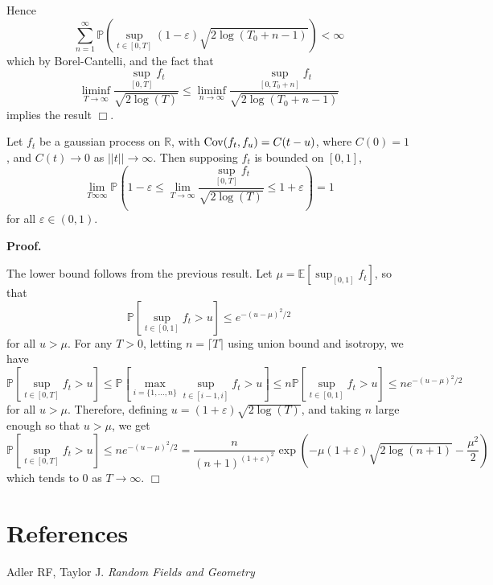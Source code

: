 \documentclass[11pt]{article}
\begin{document}
Hence
\begin{equation}\label{bcres1}
\sum_{n=1}^\infty \mathbb{P}(\sup_{t \in [0,T]} (1-\varepsilon)\sqrt{2\log(T_0+n-1)}) < \infty
\end{equation}
which by Borel-Cantelli, and the fact that
\[
\liminf_{T \to \infty} \frac{\sup_{[0,T]} f_t}{\sqrt{2 \log(T)}} \leq \liminf_{n \to \infty} \frac{\sup_{[0,T_0+n]} f_t}{\sqrt{2 \log(T_0+n-1)}}
\]
implies the result $\Box$.

\begin{theorem}
Let $f_t$ be a gaussian process on $\mathbb{R}$, with $\text{Cov}(f_t,f_u)
= C(t-u)$, where $C(0) = 1$, and $C(t) \to 0$ as $||t|| \to \infty$.
Then supposing $f_t$ is bounded on $[0,1]$,
\[
\lim_{T \infty \infty }\mathbb{P}\left(1-\varepsilon \leq \lim_{T \to \infty}\frac{\sup_{[0,T]}
    f_t}{\sqrt{2 \log(T)}} \leq 1+\varepsilon
\right) = 1
\]
for all $\varepsilon \in (0,1)$.
\end{theorem}

\noindent\textbf{Proof.}

The lower bound follows from the previous result.
Let $\mu=\mathbb{E}[\sup_{[0,1]} f_t]$, so that
\[
\mathbb{P}[\sup_{t \in [0,1]} f_t > u] \leq e^{-(u-\mu)^2/2}
\]
for all $u > \mu$.
For any $T >0$, letting $n = \lceil T \rceil$ using union bound and isotropy, we have
\[
\mathbb{P}[\sup_{t \in [0,T]} f_t > u]  \leq \mathbb{P}[\max_{i = \{1,\hdots,n\}} \sup_{t \in [i-1,i]} f_t > u] \leq n\mathbb{P}[\sup_{t \in [0,1]} f_t > u] \leq ne^{-(u-\mu)^2/2}
\]
for all $u > \mu$.
Therefore, defining $u = (1+\varepsilon)\sqrt{2\log(T)}$, and taking $n$ large enough so that $u > \mu$, we get
\[
\mathbb{P}[\sup_{t \in [0,T]} f_t > u] \leq ne^{-(u-\mu)^2/2} = \frac{n}{(n+1)^{(1+\varepsilon)^2}}\exp\left(-\mu (1+\varepsilon)\sqrt{2\log(n+1)} - \frac{\mu^2}{2}\right)
\]
which tends to 0 as $T \to \infty$. $\Box$


\section{References}

Adler RF, Taylor J. \emph{Random Fields and Geometry}
\end{document}
